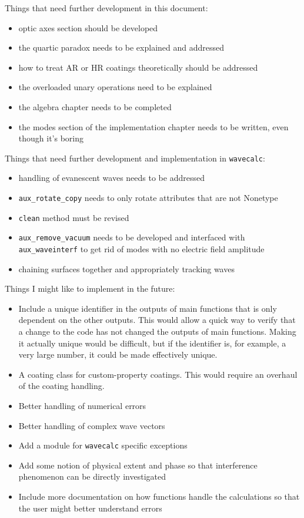 \documentclass[11pt, reqno]{book}%
\newcounter{ct}
\newcommand{\tw}[1]{{\tt #1}}
\begin{document}
\noindent Things that need further development in this document:
\begin{itemize}
\item optic axes section should be developed
\item the quartic paradox needs to be explained and addressed
\item how to treat AR or HR coatings theoretically should be addressed
\item the overloaded unary operations need to be explained
\item the algebra chapter needs to be completed
\item the modes section of the implementation chapter needs to be written, even though it's boring
\end{itemize}


\noindent Things that need further development and implementation in \tw{wavecalc}:
\begin{itemize}
\item handling of evanescent waves needs to be addressed
\item \tw{aux\_rotate\_copy} needs to only rotate attributes that are not Nonetype
\item \tw{clean} method must be revised
\item \tw{aux\_remove\_vacuum} needs to be developed and interfaced with \tw{aux\_waveinterf} to get rid of modes with no electric field amplitude
\item chaining surfaces together and appropriately tracking waves
\end{itemize}

\noindent Things I might like to implement in the future:
\begin{itemize}
\item Include a unique identifier in the outputs of main functions that is only dependent on the other outputs. This would allow a quick way to verify that a change to the code has not changed the outputs of main functions. Making it actually unique would be difficult, but if the identifier is, for example, a very large number, it could be made effectively unique. 
\item A coating class for custom-property coatings. This would require an overhaul of the coating handling.
\item Better handling of numerical errors
\item Better handling of complex wave vectors
\item Add a module for \tw{wavecalc} specific exceptions
\item Add some notion of physical extent and phase so that interference phenomenon can be directly investigated
\item Include more documentation on how functions handle the calculations so that the user might better understand errors
\end{itemize}
\end{document}
